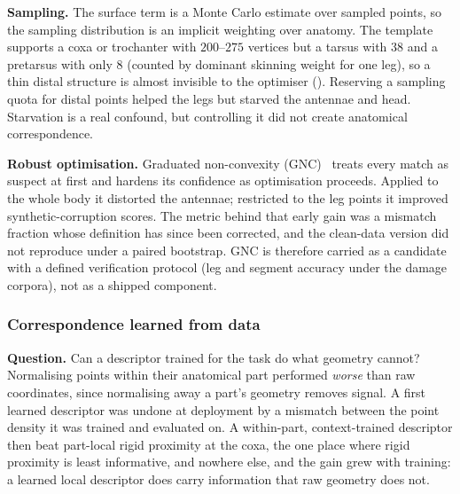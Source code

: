 \textbf{Sampling.} The surface term is a Monte Carlo estimate over sampled
points, so the sampling distribution is an implicit weighting over anatomy.
The template supports a coxa or trochanter with $200$--$275$ vertices but a
tarsus with $38$ and a pretarsus with only $8$ (counted by dominant skinning
weight for one leg), so a thin distal structure is almost invisible to the
optimiser (). Reserving a sampling quota for distal points helped the legs
but starved the antennae and head. Starvation is a real confound, but
controlling it did not create anatomical correspondence.

\textbf{Robust optimisation.} Graduated non-convexity (GNC)~\cite{gnc} treats
every match as suspect at first and hardens its confidence as optimisation
proceeds. Applied to the whole body it distorted the antennae; restricted to the leg
points it improved synthetic-corruption scores. The metric behind that early
gain was a mismatch fraction whose definition has since been corrected, and the
clean-data version did not reproduce under a paired bootstrap. GNC is therefore
carried as a candidate with a defined verification protocol (leg and segment
accuracy under the damage corpora), not as a shipped component.

\subsubsection{Correspondence learned from data}
\label{sec:learned-correspondence}

\textbf{Question.} Can a descriptor trained for the task do what geometry
cannot? Normalising points within their anatomical part performed \emph{worse}
than raw coordinates, since normalising away a part's geometry removes signal.
A first learned descriptor was undone at deployment by a mismatch between the
point density it was trained and evaluated on. A within-part,
context-trained descriptor then beat part-local rigid proximity at the coxa, the
one place where rigid proximity is least informative, and nowhere else, and the gain grew with
training: a learned local descriptor does carry information that raw geometry
does not.

